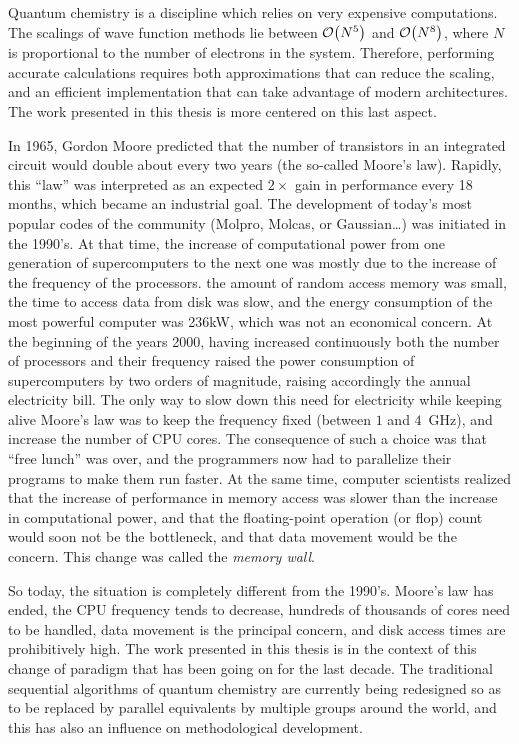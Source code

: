 \documentclass[12pt,a4paper]{report}
\begin{document}

Quantum chemistry is a discipline which relies on very expensive computations.
The scalings of wave function methods lie between $\order{N^5}$ and
$\order{N^8}$, where $N$ is proportional to the number of electrons in the
system. Therefore, performing accurate calculations requires both
approximations that can reduce the scaling, and an efficient implementation
that can take advantage of modern architectures. The work presented in this
thesis is more centered on this last aspect. 

In 1965, Gordon Moore predicted that the number of transistors in an integrated
circuit would double about every two years (the so-called Moore's
law).\cite{Moore}  Rapidly, this ``law'' was interpreted as an expected
$2\times$ gain in performance every 18 months, which became an industrial goal.
The development of today's most popular codes of the community
(Molpro\cite{Molpro}, Molcas\cite{Molcas}, or Gaussian\cite{g09}\dots) was
initiated in the 1990's.  At that time, the increase of computational power
from one generation of supercomputers to the next one was mostly due to the
increase of the frequency of the processors. the amount of random access memory
was small, the time to access data from disk was slow, and the energy
consumption of the most powerful computer was 236kW, which was not an
economical concern.\cite{top500_93}
At the beginning of the years 2000, having increased continuously both the number
of processors and their frequency raised the power consumption of
supercomputers by two orders of magnitude, raising accordingly the annual
electricity bill.  The only way to slow down this need for electricity while
keeping alive Moore's law was to keep the frequency fixed (between $1$ and
$4$~GHz), and increase the number of CPU cores.  The consequence of such a
choice was that ``free lunch'' was over, and the programmers now had to parallelize
their programs to make them run faster.\cite{Sutter_2005}
At the same time, computer scientists
realized that the increase of performance in memory access was slower than the
increase in computational power,\cite{Wulf1995Mar} and that the floating-point
operation (or flop) count would soon not be the bottleneck, and that data
movement would be the concern. This change was called the \emph{memory wall}.

So today, the situation is completely different from the 1990's.
Moore's law has ended,\cite{Khan2018Jan} the CPU frequency tends to decrease,
hundreds of thousands of cores need to be handled, data movement is the
principal concern, and disk access times are prohibitively high.
The work presented in this thesis is in the context of this change of paradigm
that has been going on for the last decade.
The traditional sequential algorithms of quantum chemistry are currently being
redesigned so as to be replaced by parallel equivalents by multiple groups
around the world, and this has also an influence on methodological development.
\end{document}
